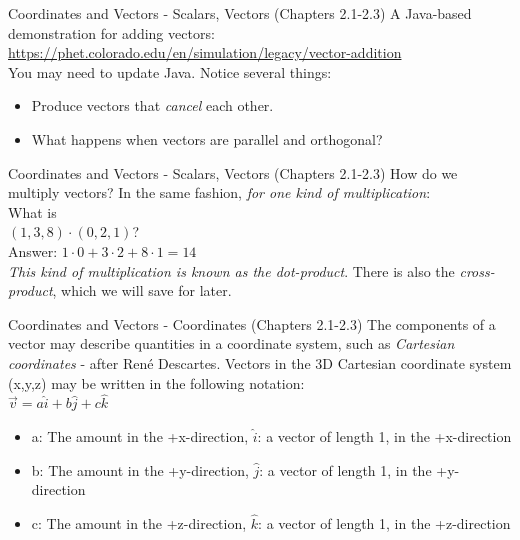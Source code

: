 \documentclass{beamer}
\begin{document}
\begin{frame}{Coordinates and Vectors - Scalars, Vectors (Chapters 2.1-2.3)}
A Java-based demonstration for adding vectors: \\
\vspace{0.5cm}
\url{https://phet.colorado.edu/en/simulation/legacy/vector-addition}
\vspace{0.5cm} \\
You may need to update Java.  Notice several things:
\begin{itemize}
\item Produce vectors that \textit{cancel} each other.
\item What happens when vectors are parallel and orthogonal?
\end{itemize}
\end{frame}

\begin{frame}{Coordinates and Vectors - Scalars, Vectors (Chapters 2.1-2.3)}
How do we multiply vectors? In the same fashion, \textit{for one kind of multiplication}:\\
\vspace{0.5cm}
What is\\
$(1,3,8)\cdot (0,2,1)$? \\
Answer: $1\cdot 0 + 3 \cdot 2 + 8 \cdot 1 = 14$ \\
\vspace{0.5cm}
\textit{This kind of multiplication is known as the dot-product}.  There is also the \textit{cross-product}, which we will save for later.
\end{frame}

\begin{frame}{Coordinates and Vectors - Coordinates (Chapters 2.1-2.3)}
\small
The components of a vector may describe quantities in a \alert{coordinate system}, such as \textit{Cartesian coordinates} - after Ren\'e Descartes.  Vectors in the 3D Cartesian coordinate system (x,y,z) may be written in the following notation:
\\
\vspace{0.2cm}
$\boxed{\vec{v} = a\hat{i} + b\hat{j} + c\hat{k}}$
\\
\begin{itemize}
\item a: The amount in the +x-direction, $\hat{i}$: a vector of length 1, in the +x-direction
\item b: The amount in the +y-direction, $\hat{j}$: a vector of length 1, in the +y-direction
\item c: The amount in the +z-direction, $\hat{k}$: a vector of length 1, in the +z-direction
\end{itemize}
\end{frame}
\end{document}
